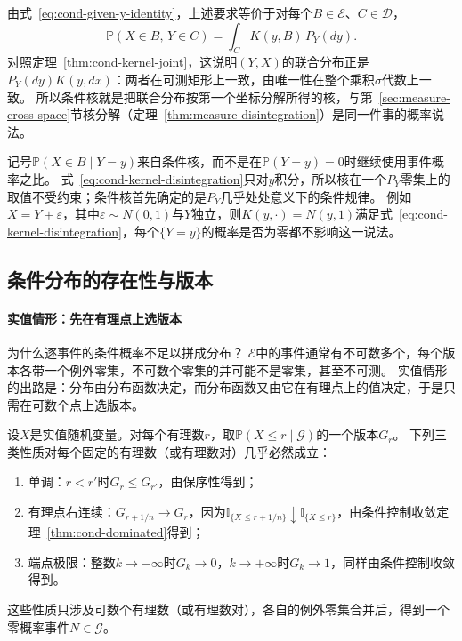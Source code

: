 由式~\eqref{eq:cond-given-y-identity}，上述要求等价于对每个$B\in\mathcal E$、$C\in\mathcal D$，
\begin{equation}
  \mathbb P(X\in B,\,Y\in C)=\int_CK(y,B)\,P_Y(dy).
  \label{eq:cond-kernel-disintegration}
\end{equation}
对照定理~\ref{thm:cond-kernel-joint}，这说明$(Y,X)$的联合分布正是$P_Y(dy)K(y,dx)$：两者在可测矩形上一致，由唯一性在整个乘积$\sigma$代数上一致。
所以条件核就是把联合分布按第一个坐标分解所得的核，与第~\ref{sec:measure-cross-space}节核分解（定理~\ref{thm:measure-disintegration}）是同一件事的概率说法。

记号$\mathbb P(X\in B\mid Y=y)$来自条件核，而不是在$\mathbb P(Y=y)=0$时继续使用事件概率之比。
式~\eqref{eq:cond-kernel-disintegration}只对$y$积分，所以核在一个$P_Y$零集上的取值不受约束；条件核首先确定的是$P_Y$几乎处处意义下的条件规律。
例如$X=Y+\varepsilon$，其中$\varepsilon\sim N(0,1)$与$Y$独立，则$K(y,\cdot)=N(y,1)$满足式~\eqref{eq:cond-kernel-disintegration}，每个$\{Y=y\}$的概率是否为零都不影响这一说法。

\subsection{条件分布的存在性与版本}

\paragraph{实值情形：先在有理点上选版本}
为什么逐事件的条件概率不足以拼成分布？
$\mathcal E$中的事件通常有不可数多个，每个版本各带一个例外零集，不可数个零集的并可能不是零集，甚至不可测。
实值情形的出路是：分布由分布函数决定，而分布函数又由它在有理点上的值决定，于是只需在可数个点上选版本。

设$X$是实值随机变量。对每个有理数$r$，取$\mathbb P(X\leq r\mid\mathcal G)$的一个版本$G_r$。
下列三类性质对每个固定的有理数（或有理数对）几乎必然成立：
\begin{enumerate}
  \item 单调：$r<r'$时$G_r\leq G_{r'}$，由保序性得到；
  \item 有理点右连续：$G_{r+1/n}\to G_r$，因为$\mathbb I_{\{X\leq r+1/n\}}\downarrow\mathbb I_{\{X\leq r\}}$，由条件控制收敛定理~\ref{thm:cond-dominated}得到；
  \item 端点极限：整数$k\to-\infty$时$G_k\to0$，$k\to+\infty$时$G_k\to1$，同样由条件控制收敛得到。
\end{enumerate}
这些性质只涉及可数个有理数（或有理数对），各自的例外零集合并后，得到一个零概率事件$N\in\mathcal G$。

